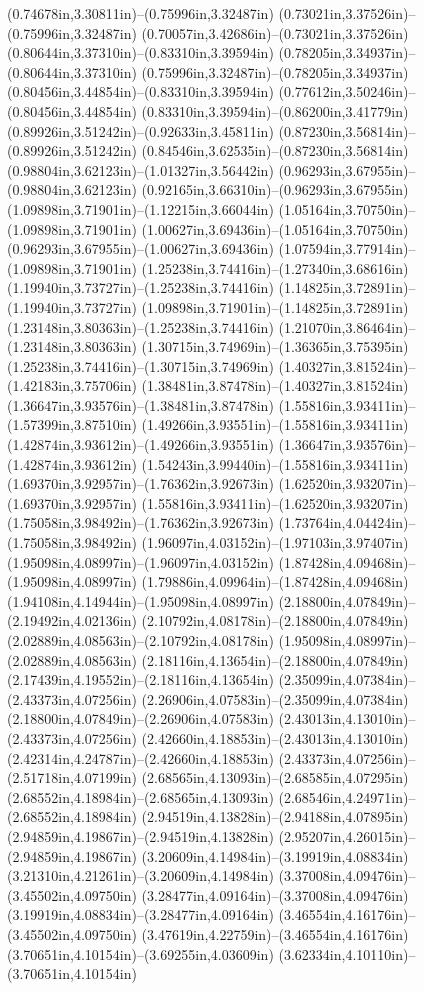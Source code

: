 (0.74678in,3.30811in)--(0.75996in,3.32487in) (0.73021in,3.37526in)--(0.75996in,3.32487in) (0.70057in,3.42686in)--(0.73021in,3.37526in) (0.80644in,3.37310in)--(0.83310in,3.39594in) (0.78205in,3.34937in)--(0.80644in,3.37310in) (0.75996in,3.32487in)--(0.78205in,3.34937in) (0.80456in,3.44854in)--(0.83310in,3.39594in) (0.77612in,3.50246in)--(0.80456in,3.44854in) (0.83310in,3.39594in)--(0.86200in,3.41779in) (0.89926in,3.51242in)--(0.92633in,3.45811in) (0.87230in,3.56814in)--(0.89926in,3.51242in) (0.84546in,3.62535in)--(0.87230in,3.56814in) (0.98804in,3.62123in)--(1.01327in,3.56442in) (0.96293in,3.67955in)--(0.98804in,3.62123in) (0.92165in,3.66310in)--(0.96293in,3.67955in) (1.09898in,3.71901in)--(1.12215in,3.66044in) (1.05164in,3.70750in)--(1.09898in,3.71901in) (1.00627in,3.69436in)--(1.05164in,3.70750in) (0.96293in,3.67955in)--(1.00627in,3.69436in) (1.07594in,3.77914in)--(1.09898in,3.71901in) (1.25238in,3.74416in)--(1.27340in,3.68616in) (1.19940in,3.73727in)--(1.25238in,3.74416in) (1.14825in,3.72891in)--(1.19940in,3.73727in) (1.09898in,3.71901in)--(1.14825in,3.72891in) (1.23148in,3.80363in)--(1.25238in,3.74416in) (1.21070in,3.86464in)--(1.23148in,3.80363in) (1.30715in,3.74969in)--(1.36365in,3.75395in) (1.25238in,3.74416in)--(1.30715in,3.74969in) (1.40327in,3.81524in)--(1.42183in,3.75706in) (1.38481in,3.87478in)--(1.40327in,3.81524in) (1.36647in,3.93576in)--(1.38481in,3.87478in) (1.55816in,3.93411in)--(1.57399in,3.87510in) (1.49266in,3.93551in)--(1.55816in,3.93411in) (1.42874in,3.93612in)--(1.49266in,3.93551in) (1.36647in,3.93576in)--(1.42874in,3.93612in) (1.54243in,3.99440in)--(1.55816in,3.93411in) (1.69370in,3.92957in)--(1.76362in,3.92673in) (1.62520in,3.93207in)--(1.69370in,3.92957in) (1.55816in,3.93411in)--(1.62520in,3.93207in) (1.75058in,3.98492in)--(1.76362in,3.92673in) (1.73764in,4.04424in)--(1.75058in,3.98492in) (1.96097in,4.03152in)--(1.97103in,3.97407in) (1.95098in,4.08997in)--(1.96097in,4.03152in) (1.87428in,4.09468in)--(1.95098in,4.08997in) (1.79886in,4.09964in)--(1.87428in,4.09468in) (1.94108in,4.14944in)--(1.95098in,4.08997in) (2.18800in,4.07849in)--(2.19492in,4.02136in) (2.10792in,4.08178in)--(2.18800in,4.07849in) (2.02889in,4.08563in)--(2.10792in,4.08178in) (1.95098in,4.08997in)--(2.02889in,4.08563in) (2.18116in,4.13654in)--(2.18800in,4.07849in) (2.17439in,4.19552in)--(2.18116in,4.13654in) (2.35099in,4.07384in)--(2.43373in,4.07256in) (2.26906in,4.07583in)--(2.35099in,4.07384in) (2.18800in,4.07849in)--(2.26906in,4.07583in) (2.43013in,4.13010in)--(2.43373in,4.07256in) (2.42660in,4.18853in)--(2.43013in,4.13010in) (2.42314in,4.24787in)--(2.42660in,4.18853in) (2.43373in,4.07256in)--(2.51718in,4.07199in) (2.68565in,4.13093in)--(2.68585in,4.07295in) (2.68552in,4.18984in)--(2.68565in,4.13093in) (2.68546in,4.24971in)--(2.68552in,4.18984in) (2.94519in,4.13828in)--(2.94188in,4.07895in) (2.94859in,4.19867in)--(2.94519in,4.13828in) (2.95207in,4.26015in)--(2.94859in,4.19867in) (3.20609in,4.14984in)--(3.19919in,4.08834in) (3.21310in,4.21261in)--(3.20609in,4.14984in) (3.37008in,4.09476in)--(3.45502in,4.09750in) (3.28477in,4.09164in)--(3.37008in,4.09476in) (3.19919in,4.08834in)--(3.28477in,4.09164in) (3.46554in,4.16176in)--(3.45502in,4.09750in) (3.47619in,4.22759in)--(3.46554in,4.16176in) (3.70651in,4.10154in)--(3.69255in,4.03609in) (3.62334in,4.10110in)--(3.70651in,4.10154in) 